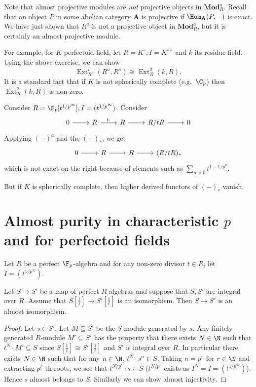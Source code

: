 \documentclass[a4paper]{article}
\renewcommand{\c}[1]{\mathbf{#1}}
\newcommand{\Mod}{{\c{Mod}}}
\DeclareMathOperator{\Ext}{Ext} %
\begin{document}
\begin{remark}
  Note that almost projective modules are \emph{not} projective objects in \(\Mod_R^a\). Recall that an object \(P\) in some abelian category \(\c A\) is projective if \(\Hom_{\c A}(P, -)\) is exact. We have just shown that \(R^a\) is not a projective object in \(\Mod_R^a\), but it is certainly an almost projective module.

  For example, for \(K\) perfectoid field, let \(R = K^\circ, I = K^{\circ \circ}\) and \(k\) its residue field. Using the above exercise, we can show
  \[
    \Ext_{R^a}^i(R^a, R^a) \cong \Ext_R^2(k, R).
  \]
  It is a standard fact that if \(K\) is not spherically complete (e.g.\ \(\C_p\)) then \(\Ext^2_R(k, R)\) is non-zero.
\end{remark}

\begin{ex}
  Consider \(R = \F_p[t^{1/p^\infty}], I = (t^{1/p^\infty})\). Consider
  \[
    \begin{tikzcd}
      0 \ar[r] & R \ar[r, "t\cdot"] & R \ar[r] & R/tR \ar[r] & 0
    \end{tikzcd}
  \]
  Applying \((-)^a\) and the \((-)_*\), we get
  \[
    \begin{tikzcd}
      0 \ar[r] & R \ar[r] & R \ar[r] & (R/tR)_*
    \end{tikzcd}
  \]
  which is not exact on the right because of elements such as \(\sum_{n > 0} t^{1- 1/p^n}\).
\end{ex}

But if \(K\) is spherically complete, then higher derived functors of \((-)_*\) vanish.

\section{Almost purity in characteristic \(p\) and for perfectoid fields}

Let \(R\) be a perfect \(\F_p\)-algebra and for any non-zero divisor \(t \in R\), let \(I = (t^{1/p^\infty})\).

\begin{proposition}
  Let \(S \to S'\) be a map of perfect \(R\)-algebras and suppose that \(S, S'\) are integral over \(R\). Assume that \(S[\frac{1}{t}] \to S'[\frac{1}{t}]\) is an isomorphism. Then \(S \to S'\) is an almost isomorphism.
\end{proposition}

\begin{proof}
  Let \(s \in S'\). Let \(M \subseteq S'\) be the \(S\)-module generated by \(s\). Any finitely generated \(R\)-module \(M' \subseteq S'\) has the property that there exists \(N \in \N\) such that \(t^N \cdot M' \subseteq S\) since \(S[\frac{1}{t}] \cong S'[\frac{1}{t}]\) and \(S'\) is integral over \(R\). In particular there exists \(N \in \N\) such that for any \(n \in \N\), \(t^N \cdot s^n \in S\). Taking \(n = p^r\) for \(r \in \N\) and extracting \(p^r\)-th roots, we see that \(t^{N/p^r} \cdot s \in S\) (\(t^{N/p^r}\) exists as \(I^N = I = (t^{1/p^\infty})\)). Hence \(s\) almost belongs to \(S\). Similarly we can show almost injectivity.
\end{proof}
\end{document}
